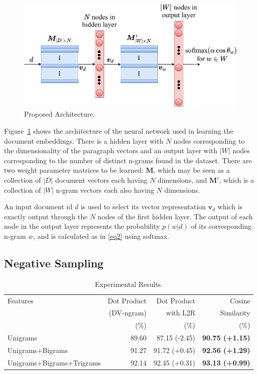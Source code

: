 \documentclass[11pt,a4paper]{article}
\begin{document}
\begin{figure}[h]
\includegraphics[width=1.02\linewidth,right]{architecture.pdf}
\caption{Proposed Architecture.}
\label{architecture}
\end{figure}

Figure~\ref{architecture} shows the architecture of the neural network used in learning the document embeddings. There is a hidden layer with $N$ nodes corresponding to the dimensionality of the paragraph vectors and an output layer with $\lvert W \rvert$ nodes corresponding to the number of distinct n-grams found in the dataset. There are two weight parameter matrices to be learned: $\mathbold{M}$, which may be seen as a collection of $\lvert D \rvert$ document vectors each having $N$ dimensions, and $\mathbold{M}'$, which is a collection of $\lvert W \rvert$ n-gram vectors each also having $N$ dimensions. 



An input document id $d$ is used to select its vector representation $\mathbold{v}_d$ which is exactly output through the $N$ nodes of the first hidden layer.  The output of each node in the output layer represents the probability $p(w|d)$ of its corresponding n-gram $w$, and is calculated as in \eqref{eq2} using softmax.

\subsection{Negative Sampling}

\setlength{\tabcolsep}{8pt}
\begin{table}[t]
	\centering
	\small
	\begin{tabular}{@{\hskip6pt}lrrr@{\hskip6pt}}
		\toprule
		Features & Dot Product  & Dot Product &Cosine \\ 
		& (DV-ngram)  &with L2R &   Similarity\\
		&  (\%)& (\%)&   (\%) \\
		\midrule
		Unigrams & 89.60 & 87.15 (-2.45) & \bf{90.75 (+1.15)}  \\
		Unigrams+Bigrams & 91.27 & 91.72 (+0.45) & \bf{92.56 (+1.29)} \\
		Unigrams+Bigrams+Trigrams& 92.14  &92.45 (+0.31) & \bf{93.13 (+0.99)} \\
		\bottomrule
	\end{tabular}
	\caption{Experimental Results.}
	\label{er}
\end{table}
\end{document}
